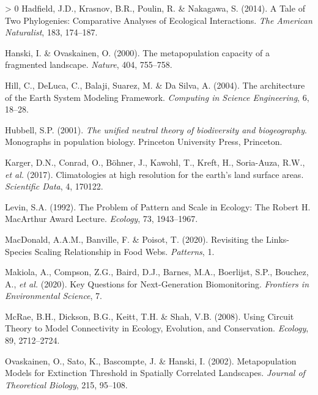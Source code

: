 \documentclass[10pt,oneside]{article}
\newlength{\cslhangindent}
\newenvironment{CSLReferences}[3] %
 {%
  \setlength{\parindent}{0pt}
  \ifodd #1 \everypar{\setlength{\hangindent}{\cslhangindent}}\ignorespaces\fi
  \ifnum #2 > 0
  \setlength{\parskip}{#2\baselineskip}
  \fi
 }%
 {}
\begin{document}
\begin{CSLReferences}{1}{0}
\leavevmode\hypertarget{ref-Hadfield2014TalTwo}{}%
Hadfield, J.D., Krasnov, B.R., Poulin, R. \& Nakagawa, S. (2014). A Tale
of Two Phylogenies: Comparative Analyses of Ecological Interactions.
\emph{The American Naturalist}, 183, 174--187.

\leavevmode\hypertarget{ref-Hanski2000MetCap}{}%
Hanski, I. \& Ovaskainen, O. (2000). The metapopulation capacity of a
fragmented landscape. \emph{Nature}, 404, 755--758.

\leavevmode\hypertarget{ref-Hill2004ArcEar}{}%
Hill, C., DeLuca, C., Balaji, Suarez, M. \& Da Silva, A. (2004). The
architecture of the Earth System Modeling Framework. \emph{Computing in
Science Engineering}, 6, 18--28.

\leavevmode\hypertarget{ref-Hubbell2001UniNeu}{}%
Hubbell, S.P. (2001). \emph{The unified neutral theory of biodiversity
and biogeography}. Monographs in population biology. Princeton
University Press, Princeton.

\leavevmode\hypertarget{ref-Karger2017CliHig}{}%
Karger, D.N., Conrad, O., Böhner, J., Kawohl, T., Kreft, H., Soria-Auza,
R.W., \emph{et al.} (2017). Climatologies at high resolution for the
earth's land surface areas. \emph{Scientific Data}, 4, 170122.

\leavevmode\hypertarget{ref-Levin1992ProPat}{}%
Levin, S.A. (1992). The Problem of Pattern and Scale in Ecology: The
Robert H. MacArthur Award Lecture. \emph{Ecology}, 73, 1943--1967.

\leavevmode\hypertarget{ref-MacDonald2020RevLin}{}%
MacDonald, A.A.M., Banville, F. \& Poisot, T. (2020). Revisiting the
Links-Species Scaling Relationship in Food Webs. \emph{Patterns}, 1.

\leavevmode\hypertarget{ref-Makiola2020KeyQue}{}%
Makiola, A., Compson, Z.G., Baird, D.J., Barnes, M.A., Boerlijst, S.P.,
Bouchez, A., \emph{et al.} (2020). Key Questions for Next-Generation
Biomonitoring. \emph{Frontiers in Environmental Science}, 7.

\leavevmode\hypertarget{ref-McRae2008UsiCir}{}%
McRae, B.H., Dickson, B.G., Keitt, T.H. \& Shah, V.B. (2008). Using
Circuit Theory to Model Connectivity in Ecology, Evolution, and
Conservation. \emph{Ecology}, 89, 2712--2724.

\leavevmode\hypertarget{ref-Ovaskainen2002MetMod}{}%
Ovaskainen, O., Sato, K., Bascompte, J. \& Hanski, I. (2002).
Metapopulation Models for Extinction Threshold in Spatially Correlated
Landscapes. \emph{Journal of Theoretical Biology}, 215, 95--108.


\end{CSLReferences}
\end{document}
